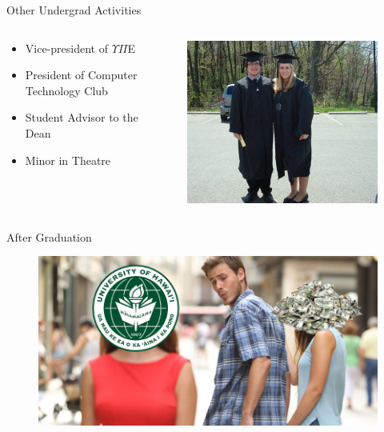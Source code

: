 \documentclass{beamer}
\begin{document}
\begin{frame}{Other Undergrad Activities}
\begin{columns}
	\begin{column}{.50\textwidth}
		\begin{itemize}
			\item Vice-president of $\Upsilon\Pi$E
			\item President of Computer Technology Club
			\item Student Advisor to the Dean
			\item Minor in Theatre
		\end{itemize}
	\end{column}
	\begin{column}{.50\textwidth}
		\begin{figure}
			\includegraphics[width=\linewidth]{img/chrissie.jpg}
		\end{figure}
	\end{column}
\end{columns}
\end{frame}

\begin{frame}{After Graduation}
\begin{figure}
	\includegraphics[width=\linewidth]{img/uh.png}
\end{figure}
\end{frame}
\end{document}
